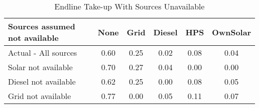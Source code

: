 \begin{table}[htbp]\centering
\caption{Endline Take-up With Sources Unavailable\label {tab1}}
\begin{tabular}{l*{5}{c}}
\toprule
Sources assumed not available    &        None&        Grid&      Diesel&         HPS&    OwnSolar\\
\midrule
Actual - All sources&        \cellcolor{yellow}0.60&        0.25&        0.02&        0.08&        0.04\\
Solar not available&       \cellcolor{yellow}0.70&        0.27&        0.04&        0.00&        0.00\\
Diesel not available&        0.62&        0.25&        0.00&        0.08&        0.05\\
Grid not available&        0.77&        0.00&        0.05&        0.11&        0.07\\
\bottomrule
\end{tabular}
\end{table}
